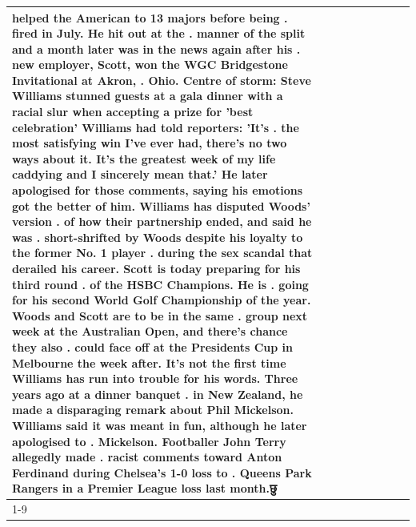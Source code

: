 \begin{table}[H]
\begin{tabular}{lllrlllll}
helped the American to 13 majors before being . fired in July. He hit out at the . manner of the split and a month later was in the news again after his . new employer, Scott, won the WGC Bridgestone Invitational at Akron, . Ohio. Centre of storm: Steve Williams stunned guests at a gala dinner with a racial slur when accepting a prize for 'best celebration' Williams had told reporters: 'It's . the most satisfying win I've ever had, there's no two ways about it. It's the greatest week of my life caddying and I sincerely mean that.' He later apologised for those comments, saying his emotions got the better of him. Williams has disputed Woods' version . of how their partnership ended, and said he was . short-shrifted by Woods despite his loyalty to the former No. 1 player . during the sex scandal that derailed his career. Scott is today preparing for his third round . of the HSBC Champions. He is . going for his second World Golf Championship of the year. Woods and Scott are to be in the same . group next week at the Australian Open, and there's chance they also . could face off at the Presidents Cup in Melbourne the week after. It's not the first time Williams has run into trouble for his words. Three years ago at a dinner banquet . in New Zealand, he made a disparaging remark about Phil Mickelson. Williams said it was meant in fun, although he later apologised to . Mickelson. Footballer John Terry allegedly made . racist comments toward Anton Ferdinand during Chelsea's 1-0 loss to . Queens Park Rangers in a Premier League loss last month.छु \\
\cline{1-9}

\end{tabular}
\end{table}
